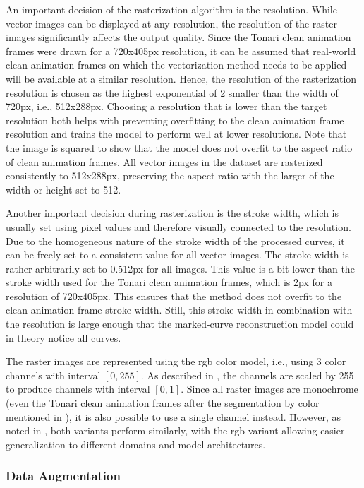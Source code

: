 An important decision of the rasterization algorithm is the resolution. While vector images can be displayed at any resolution, the resolution of the raster images significantly affects the output quality. Since the Tonari clean animation frames were drawn for a 720x405px resolution, it can be assumed that real-world clean animation frames on which the vectorization method needs to be applied will be available at a similar resolution. Hence, the resolution of the rasterization resolution is chosen as the highest exponential of 2 smaller than the width of 720px, i.e., 512x288px. Choosing a resolution that is lower than the target resolution both helps with preventing overfitting to the clean animation frame resolution and trains the model to perform well at lower resolutions. Note that the image is squared to show that the model does not overfit to the aspect ratio of clean animation frames. All vector images in the dataset are rasterized consistently to 512x288px, preserving the aspect ratio with the larger of the width or height set to 512.

Another important decision during rasterization is the stroke width, which is usually set using pixel values and therefore visually connected to the resolution. Due to the homogeneous nature of the stroke width of the processed curves, it can be freely set to a consistent value for all vector images. The stroke width is rather arbitrarily set to 0.512px for all images. This value is a bit lower than the stroke width used for the Tonari clean animation frames, which is 2px for a resolution of 720x405px. This ensures that the method does not overfit to the clean animation frame stroke width. Still, this stroke width in combination with the resolution is large enough that the marked-curve reconstruction model could in theory notice all curves.

The raster images are represented using the \gls{rgb} color model, i.e., using 3 color channels with interval $[0,255]$. As described in , the channels are scaled by 255 to produce channels with interval $[0,1]$. Since all raster images are monochrome (even the Tonari clean animation frames after the segmentation by color mentioned in ), it is also possible to use a single channel instead. However, as noted in , both variants perform similarly, with the \gls{rgb} variant allowing easier generalization to different domains and model architectures.

\subsubsection{Data Augmentation}
\label{subsec:dataaug}

